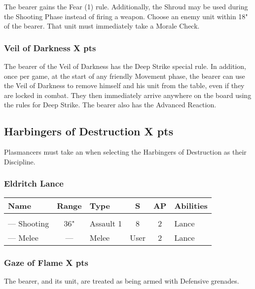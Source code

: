 The bearer gains the Fear (1) rule. Additionally, the Shroud may be used during the Shooting Phase instead of firing a weapon. Choose an enemy unit within 18" of the bearer. That unit must immediately take a Morale Check.

\subsubsection[Veil of Darkness ]{Veil of Darkness  \hrulefill X pts}

The bearer of the Veil of Darkness has the Deep Strike special rule. In addition, once per game, at the start of any friendly Movement phase, the bearer can use the Veil of Darkness to remove himself and his unit from the table, even if they are locked in combat. They then immediately arrive anywhere on the board using the rules for Deep Strike. The bearer also has the  Advanced Reaction.



\subsection[Harbingers of Destruction ]{Harbingers of Destruction  \hrulefill X pts}

Plasmancers must take an  when selecting the Harbingers of Destruction as their Discipline.

\subsubsection{Eldritch Lance}
\label{Eldritch Lance}
\noindent
\begin{NiceTabular}{L{115 pt} c C{40pt} *{2}{c} >{\raggedright\arraybackslash}p{240pt}}
	Name & Range & Type & S & AP & Abilities \\
	\hline
	 &  &  &  &  & \\
	— Shooting & 36" & Assault 1 & 8 & 2 &Lance \\
	— Melee & — & Melee & User & 2 & Lance \\
\end{NiceTabular}

\subsubsection[Gaze of Flame ]{Gaze of Flame  \hrulefill X pts}

The bearer, and its unit, are treated as being armed with Defensive grenades.

